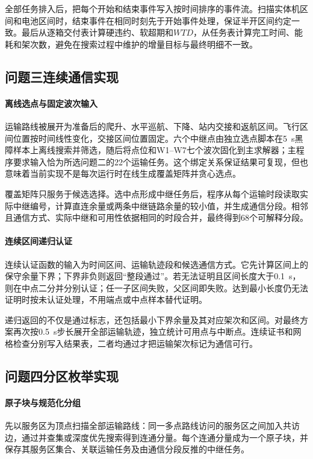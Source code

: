 全部任务排入后，把每个开始和结束事件写入按时间排序的事件流。扫描实体机区间和电池区间时，结束事件在相同时刻先于开始事件处理，保证半开区间约定一致。最后从逐箱交付表计算硬违约、软超期和$WTD$，从任务表计算完工时间、能耗和架次数，避免在搜索过程中维护的增量目标与最终明细不一致。

\subsection{问题三连续通信实现}
\paragraph{离线选点与固定波次输入}
运输路线被展开为准备后的爬升、水平巡航、下降、站内交接和返航区间。飞行区间位置按时间线性变化，交接区间位置固定。六个中继点由独立选点脚本在5~s黑障样本上离线搜索并筛选，随后将点位和W1--W7七个波次固化到主求解器；主程序要求输入恰为所选问题二的22个运输任务。这个绑定关系保证结果可复现，但也意味着当前实现不是每次运行时在线生成覆盖矩阵并贪心选点。

覆盖矩阵只服务于候选选择。选中点形成中继任务后，程序从每个运输时段读取实际中继编号，计算直连余量或两条中继链路余量的较小值，并生成通信分段。相邻且通信方式、实际中继和可用性依据相同的时段合并，最终得到68个可解释分段。

\paragraph{连续区间递归认证}
连续认证函数的输入为时间区间、运输轨迹段和候选通信方式。它先计算区间上的保守余量下界；下界非负则返回“整段通过”。若无法证明且区间长度大于0.1~s，则在中点二分并分别认证；任一子区间失败，父区间即失败。达到最小长度仍无法证明时按未认证处理，不用端点或中点样本替代证明。

递归返回的不仅是通过标志，还包括最小下界余量及其对应架次和区间。对最终方案再次按0.5~s步长展开全部运输轨迹，独立统计可用点与中断点。连续证书和网格检查分别写入结果表，二者均通过才把运输架次标记为通信可行。

\subsection{问题四分区枚举实现}
\paragraph{原子块与规范化分组}
先以服务区为顶点扫描全部运输路线：同一多点路线访问的服务区之间加入共访边，通过并查集或深度优先搜索得到连通分量。每个连通分量成为一个原子块，并保存其服务区集合、关联运输任务及由通信分段反推的中继任务。

